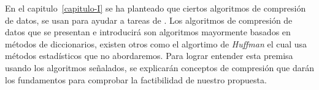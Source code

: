 En el capitulo~\ref{capitulo-I} se ha planteado que ciertos algoritmos de compresión de datos, se usan para ayudar a tareas de \machinelearning. Los algoritmos de compresión de datos que se presentan e introducirá son algoritmos mayormente basados en métodos de diccionarios, existen otros como el algortimo de \emph{Huffman} el cual usa métodos estadísticos que no abordaremos. Para lograr entender esta premisa usando los algoritmos señalados, se explicarán conceptos de compresión que darán los fundamentos para comprobar la factibilidad de nuestro propuesta. 



